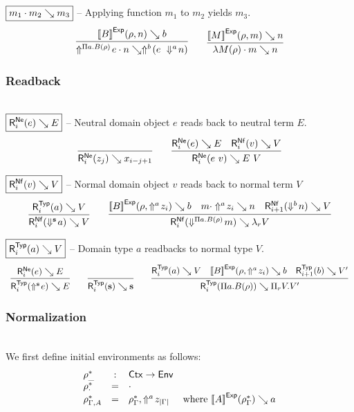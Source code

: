 \noindent
$\boxed{m_1 \cdot m_2 \searrow m_3}$ -- Applying function $m_1$ to $m_2$ yields $m_3$.
\[
\begin{array}{c}
  \infer{
    \evalapp {\dreflect {\dpi a B \rho} e} n {\dreflect b {(\dapp e {\dreify a n})}}
  }{
    \evalexp B {\rho, n} b
  }
  \qquad
  \infer{
    \evalapp {\dlam M \rho} m n
  }{
    \evalexp M {\rho, m} n
  }
\end{array}
\]



\subsubsection{Readback} \hfill\\

\noindent
$\boxed{\rbne e E}$ -- Neutral domain object $e$ reads back to neutral term $E$.
\[
\begin{array}{c}
  \infer{
    \rbne {z_j} {x_{i - j + 1}}
  }{
  }
  \qquad
  \infer{
    \rbne {\dapp e v} {\tmapp E V}
  }{
    \rbne e E
    &
    \rbnf v V
  }
\end{array}
\]


\noindent
$\boxed{\rbnf v V}$ -- Normal domain object $v$ reads back to normal term $V$
\[
\begin{array}{c}
  \infer{
    \rbnf {\dreify {\dcst s} a} V
  }{
    \rbtyp a V
  }
  \qquad
  \infer{
    \rbnf {\dreify {\dpi a B \rho} m} {\tmlam V}
  }{
    \evalexp B {\rho, \dreflect a {z_i}} b
    &
    \evalapp m {\dreflect a {z_i}} n
    &
    \rbnf[i+1] {\dreify b n} V
  }
\end{array}
\]


\noindent
$\boxed{\rbtyp a V}$ -- Domain type $a$ readbacks to normal type $V$.
\[
\begin{array}{c}
  \infer{
    \rbtyp {\dreflect {\tmcst s} e} E
  }{
    \rbne e E
  }
  \qquad
  \infer{
    \rbtyp {\tmcst s} {\tmcst s}
  }{
  }
  \qquad
  \infer{
    \rbtyp {\dpi a B \rho} {\tppi V {V'}}
  }{
    \rbtyp a V
    &
    \evalexp B {\rho, \dreflect a {z_i}} b
    &
    \rbtyp[i+1] b {V'}
  }
\end{array}
\]


\subsubsection{Normalization} \hfill\\

\noindent
We first define initial environments as follows:
\[
\begin{array}{lcll}
  \rho^*_{\_}                 & : & \mathsf{Ctx} \to \mathsf{Env} \\
  \rho^*_{\cdot}          & = & \cdot \\
  \rho^*_{\Gamma, A} & = & \rho^*_{\Gamma}, \Uparrow^{a}\!z_{|\Gamma|} & \text{where } {[\![A]\!]}^{\mathsf{Exp}}(\rho^*_{\Gamma}) \searrow a \\[8pt]
\end{array}
\]

